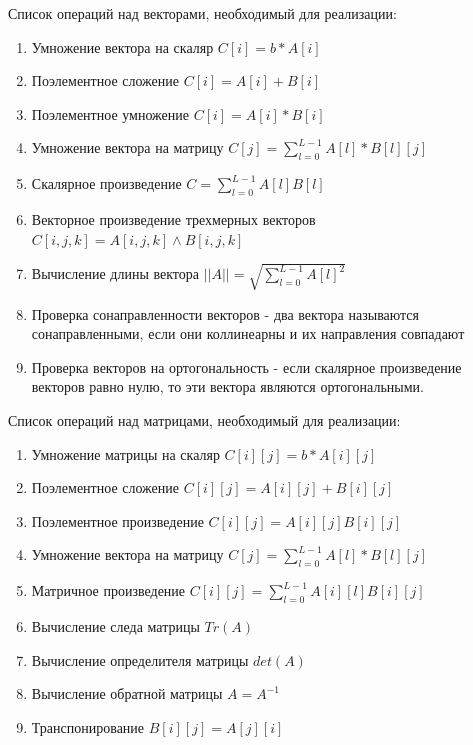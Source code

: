 \documentclass[a4paper,14pt]{extarticle}
\begin{document}
Список операций над векторами, необходимый для реализации:
\begin{enumerate}
	\item Умножение вектора на скаляр $C[i] = b * A[i]$
	\item Поэлементное сложение $C[i] = A[i] + B[i]$
	\item Поэлементное умножение $C[i] = A[i] * B[i]$
	\item Умножение вектора на матрицу 
		$C[j] = \sum\limits_{l=0}^{L-1} A[l] * B[l][j]$ 
	\item Скалярное произведение $C = \sum\limits_{l=0}^{L-1} A[l] B[l]$ 
	\item Векторное произведение трехмерных векторов \\
		$C[i, j, k] = A[i, j, k] \wedge B[i, j, k]$
	\item Вычисление длины вектора
		$|| A || = \sqrt{\sum\limits_{l=0}^{L-1} A[l]^2}$
	\item Проверка сонаправленности векторов - два вектора называются сонаправленными, если они коллинеарны и их направления совпадают
	\item Проверка векторов на ортогональность - если скалярное произведение векторов равно нулю, 	
		то эти вектора являются ортогональными.
\end{enumerate}

Список операций над матрицами, необходимый для реализации:
\begin{enumerate}
	\item Умножение матрицы на скаляр $C[i][j] = b * A[i][j]$
	\item Поэлементное сложение $C[i][j] = A[i][j] + B[i][j]$
	\item Поэлементное произведение $C[i][j] = A[i][j]B[i][j]$
	\item Умножение вектора на матрицу 
		$C[j] = \sum\limits_{l=0}^{L-1} A[l] * B[l][j]$
	\item Матричное произведение 
		$C[i][j] = \sum\limits_{l=0}^{L-1} A[i][l] B[i][j]$
	\item Вычисление следа матрицы $Tr(A)$
	\item Вычисление определителя матрицы $det(A)$
	\item Вычисление обратной матрицы $A = A^{-1}$
	\item Транспонирование $B[i][j] = A[j][i]$
\end{enumerate}

\newpage
\end{document}
